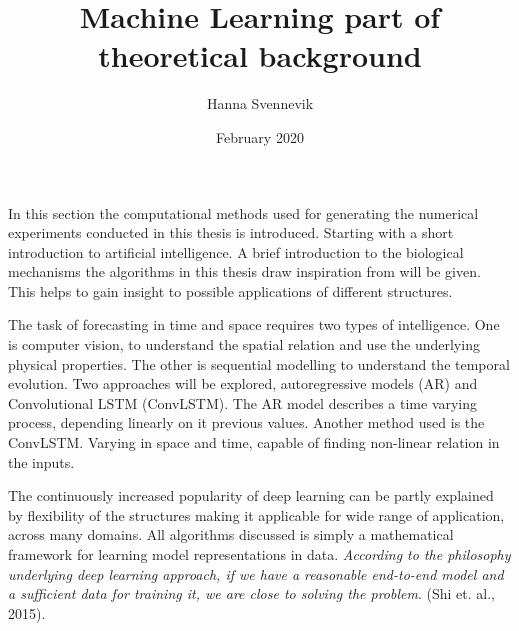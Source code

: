 \documentclass{article}
\title{Machine Learning part of theoretical background}
\author{Hanna Svennevik}
\date{February 2020}
\begin{document}
\maketitle
In this section the computational methods used for generating the numerical experiments conducted in this thesis is introduced. Starting with a short introduction to artificial intelligence. A brief introduction to the biological mechanisms the algorithms in this thesis draw inspiration from will be given. 
This helps to gain insight to possible applications of different structures. 

The task of forecasting in time and space requires two types of intelligence. One is computer vision, to understand the spatial relation and use the underlying physical properties. The other is sequential modelling to understand the temporal evolution. Two approaches will be explored, autoregressive models (AR) and Convolutional LSTM (ConvLSTM). The AR model describes a time varying process, depending linearly on it previous values. Another method used is the ConvLSTM. Varying in space and time, capable of finding non-linear relation in the inputs.

The continuously increased popularity of deep learning can be partly explained by flexibility of the structures making it applicable for wide range of application, across many domains. All algorithms discussed is simply a mathematical framework for learning model representations in data. \textit{According to the philosophy underlying deep learning approach, if we have a reasonable end-to-end model and a sufficient data for training it, we are close to solving the problem}. (Shi et. al., 2015). 

\end{document}
